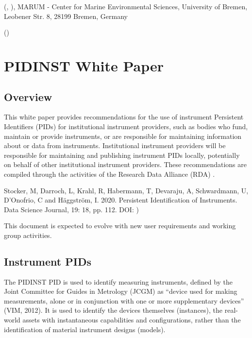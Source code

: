 \documentclass[a4paper,10pt,english]{sphinxmanual}
\begin{document}
 (, ),
MARUM - Center for Marine Environmental Sciences, University of Bremen, Leobener Str. 8, 28199 Bremen, Germany

 ()

\pagestyle{plain}
\sphinxtableofcontents
\pagestyle{normal}



\chapter{PIDINST White Paper}
\label{\detokenize{white-paper/index:pidinst-white-paper}}\label{\detokenize{white-paper/index:white-paper}}\label{\detokenize{white-paper/index::doc}}


\section{Overview}
\label{\detokenize{white-paper/overview:overview}}\label{\detokenize{white-paper/overview::doc}}
This white paper provides recommendations for the use of instrument
Persistent Identifiers (PIDs) for institutional instrument providers,
such as bodies who fund, maintain or provide instruments, or are
responsible for maintaining information about or data from instruments.
Institutional instrument providers will be responsible for maintaining
and publishing instrument PIDs locally, potentially on behalf of other
institutional instrument providers. These recommendations are compiled
through the activities of the Research Data Alliance (RDA) .%
\begin{footnote}[1]\sphinxAtStartFootnote
Stocker, M, Darroch, L, Krahl, R, Habermann, T, Devaraju, A,
Schwardmann, U, D’Onofrio, C and Häggström, I. 2020. Persistent
Identification of Instruments. Data Science Journal, 19: 18, pp.
1\textendash{}12. DOI: )
%
\end{footnote} This document is expected to evolve with
new user requirements and working group activities.


\section{Instrument PIDs}
\label{\detokenize{white-paper/instrument-pids:instrument-pids}}\label{\detokenize{white-paper/instrument-pids::doc}}
The PIDINST PID is used to identify measuring instruments, defined by
the Joint Committee for Guides in Metrology (JCGM) as “device used for
making measurements, alone or in conjunction with one or more
supplementary devices” (VIM, 2012). It is used to identify the devices
themselves (instances), the real-world assets with instantaneous
capabilities and configurations, rather than the identification of
material instrument designs (models).
\end{document}
